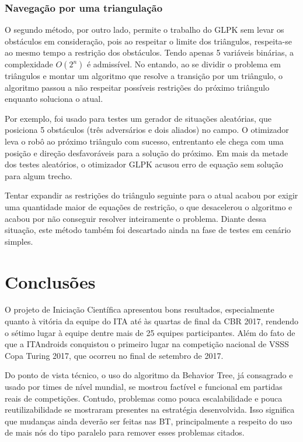 \documentclass[a4paper,12pt]{article}
\begin{document}
\subsubsection{Navegação por uma triangulação}

O segundo método, por outro lado, permite o trabalho do GLPK sem levar os obstáculos em consideração, pois ao respeitar o limite dos triângulos, respeita-se ao mesmo tempo a restrição dos obstáculos. Tendo apenas 5 variáveis binárias, a complexidade $O(2^n)$ é admissível. No entando, ao se dividir o problema em triângulos e montar um algoritmo que resolve a transição por um triângulo, o algoritmo passou a não respeitar possíveis restrições do próximo triângulo enquanto soluciona o atual.

Por exemplo, foi usado para testes um gerador de situações aleatórias, que posiciona 5 obstáculos (três adversários e dois aliados) no campo. O otimizador leva o robô ao próximo triângulo com sucesso, entrentanto ele chega com uma posição e direção desfavoráveis para a solução do próximo. Em mais da metade dos testes aleatórios, o otimizador GLPK acusou erro de equação sem solução para algum trecho.

Tentar expandir as restrições do triângulo seguinte para o atual acabou por exigir uma quantidade maior de equações de restrição, o que desacelerou o algoritmo e acabou por não conseguir resolver inteiramente o problema. Diante dessa situação, este método também foi descartado ainda na fase de testes em cenário simples.

\section{Conclusões}

O projeto de Iniciação Científica apresentou bons resultados, especialmente quanto à vitória da equipe do ITA até às quartas de final da CBR 2017, rendendo o sétimo lugar à equipe dentre mais de 25 equipes participantes. Além do fato de que a ITAndroids conquistou o primeiro lugar na competição nacional de VSSS Copa Turing 2017, que ocorreu no final de setembro de 2017.

Do ponto de vista técnico, o uso do algoritmo da Behavior Tree, já consagrado e usado por times de nível mundial, se mostrou factível e funcional em partidas reais de competições. Contudo, problemas como pouca escalabilidade e pouca reutilizabilidade se mostraram presentes na estratégia desenvolvida. Isso significa que mudanças ainda deverão ser feitas nas BT, principalmente a respeito do uso de mais nós do tipo paralelo para remover esses problemas citados.
\end{document}
